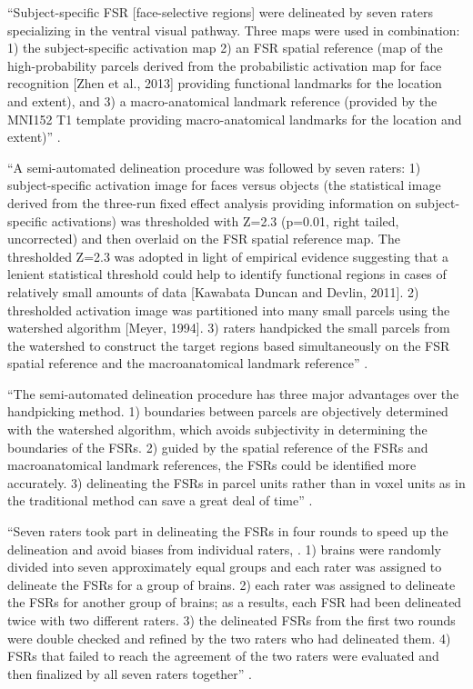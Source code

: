 ``Subject-specific FSR [face-selective regions] were delineated by seven raters
specializing in the ventral visual pathway.
%
Three maps were used in combination:
%
1) the subject-specific activation map
%
2) an FSR spatial reference (map of the high-probability parcels derived from
the probabilistic activation map for face recognition [Zhen et al.,
2013] providing functional landmarks for the location and extent), and
%
3) a macro-anatomical landmark reference (provided by the MNI152 T1 template
providing macro-anatomical landmarks for the location and extent)''
\citet{zhen2015quantifying}.

``A semi-automated delineation procedure was followed by seven raters:
%
1) subject-specific activation image for faces versus objects (the statistical
image derived from the three-run fixed effect analysis providing information on
subject-specific activations) was thresholded with Z=2.3 (p=0.01, right tailed,
uncorrected) and then overlaid on the FSR spatial reference map.
%
The thresholded Z=2.3 was adopted in light of empirical evidence suggesting
that a lenient statistical threshold could help to identify functional regions
in cases of relatively small amounts of data [Kawabata Duncan and Devlin, 2011].
%
2) thresholded activation image was partitioned into many small parcels using
the watershed algorithm [Meyer, 1994].
%
3) raters handpicked the small parcels from the watershed to construct the
target regions based simultaneously on the FSR spatial reference and the
macroanatomical landmark reference'' \citet{zhen2015quantifying}.

``The semi-automated delineation procedure has three major advantages over the
handpicking method.
%
1) boundaries between parcels are objectively determined with the watershed
algorithm, which avoids subjectivity in determining the boundaries of the FSRs.
%
2) guided by the spatial reference of the FSRs and macroanatomical landmark
references, the FSRs could be identified more accurately.
%
3) delineating the FSRs in parcel units rather than in voxel units as in the
traditional method can save a great deal of time'' \citet{zhen2015quantifying}.

``Seven raters took part in delineating the FSRs in four rounds to speed up the
delineation and avoid biases from individual raters, .
%
1) brains were randomly divided into seven approximately equal groups and each
rater was assigned to delineate the FSRs for a group of brains.
%
2) each rater was assigned to delineate the FSRs for another group of brains;
%
as a results, each FSR had been delineated twice with two different raters.
%
3) the delineated FSRs from the first two rounds were double checked and refined
by the two raters who had delineated them.
%
4) FSRs that failed to reach the agreement of the two raters were evaluated and
then finalized by all seven raters together'' \citet{zhen2015quantifying}.

